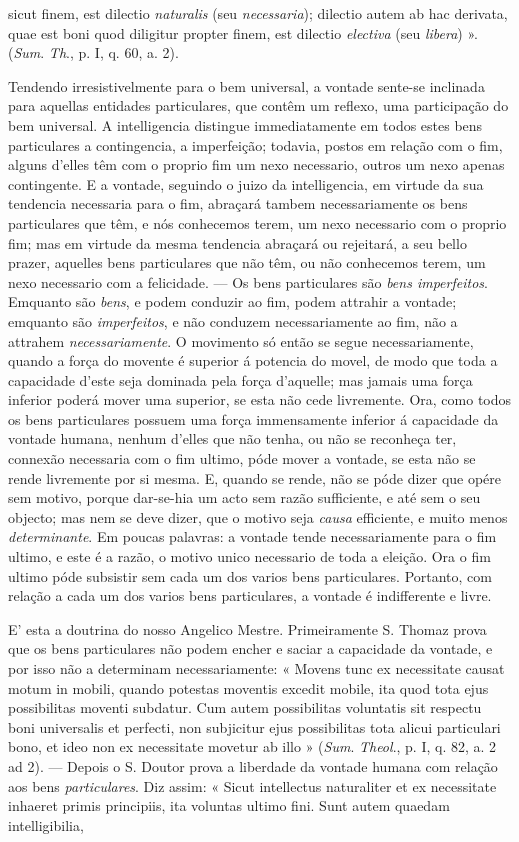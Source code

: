 sicut finem, est dilectio \emph{naturalis} (seu \emph{necessaria}); dilectio autem ab hac derivata, quae est boni quod diligitur propter finem, est dilectio \emph{electiva} (seu \emph{libera}) ». (\emph{Sum}. \emph{Th}., p. I, q. 60, a. 2).\par Tendendo irresistivelmente para o bem universal, a vontade sente-se inclinada para aquellas entidades particulares, que contêm um reflexo, uma participação do bem universal. A intelligencia distingue immediatamente em todos estes bens particulares a contingencia, a imperfeição; todavia, postos em relação com o fim, alguns d'elles têm com o proprio fim um nexo necessario, outros um nexo apenas contingente. E a vontade, seguindo o juizo da intelligencia, em virtude da sua tendencia necessaria para o fim, abraçará tambem necessariamente os bens particulares que têm, e nós conhecemos terem, um nexo necessario com o proprio fim; mas em virtude da mesma tendencia abraçará ou rejeitará, a seu bello prazer, aquelles bens particulares que não têm, ou não conhecemos terem, um nexo necessario com a felicidade. --- Os bens particulares são \emph{bens imperfeitos}. Emquanto são \emph{bens}, e podem conduzir ao fim, podem attrahir a vontade; emquanto são \emph{imperfeitos}, e não conduzem necessariamente ao fim, não a attrahem \emph{necessariamente}. O movimento só então se segue necessariamente, quando a força do movente é superior á potencia do movel, de modo que toda a capacidade d'este seja dominada pela força d'aquelle; mas jamais uma força inferior poderá mover uma superior, se esta não cede livremente. Ora, como todos os bens particulares possuem uma força immensamente inferior á capacidade da vontade humana, nenhum d'elles que não tenha, ou não se reconheça ter, connexão necessaria com o fim ultimo, póde mover a vontade, se esta não se rende livremente por si mesma. E, quando se rende, não se póde dizer que opére sem motivo, porque dar-se-hia um acto sem razão sufficiente, e até sem o seu objecto; mas nem se deve dizer, que o motivo seja \emph{causa} efficiente, e muito menos \emph{determinante}. Em poucas palavras: a vontade tende necessariamente para o fim ultimo, e este é a razão, o motivo unico necessario de toda a eleição. Ora o fim ultimo póde subsistir sem cada um dos varios bens particulares. Portanto, com relação a cada um dos varios bens particulares, a vontade é indifferente e livre.\par E' esta a doutrina do nosso Angelico Mestre. Primeiramente S. Thomaz prova que os bens particulares não podem encher e saciar a capacidade da vontade, e por isso não a determinam necessariamente: « Movens tunc ex necessitate causat motum in mobili, quando potestas moventis excedit mobile, ita quod tota ejus possibilitas moventi subdatur. Cum autem possibilitas voluntatis sit respectu boni universalis et perfecti, non subjicitur ejus possibilitas tota alicui particulari bono, et ideo non ex necessitate movetur ab illo » (\emph{Sum}. \emph{Theol}., p. I, q. 82, a. 2 ad 2). --- Depois o S. Doutor prova a liberdade da vontade humana com relação aos bens \emph{particulares}. Diz assim: « Sicut intellectus naturaliter et ex necessitate inhaeret primis principiis, ita voluntas ultimo fini. Sunt autem quaedam intelligibilia, 